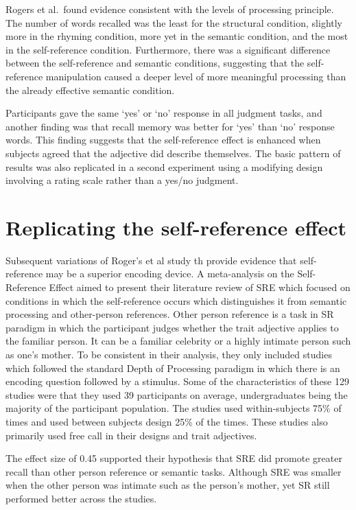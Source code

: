 \documentclass[
  man,floatsintext]{apa6}
\begin{document}
Rogers et al.~found evidence consistent with the levels of processing principle. The number of words recalled was the least for the structural condition, slightly more in the rhyming condition, more yet in the semantic condition, and the most in the self-reference condition. Furthermore, there was a significant difference between the self-reference and semantic conditions, suggesting that the self-reference manipulation caused a deeper level of more meaningful processing than the already effective semantic condition.

Participants gave the same `yes' or `no' response in all judgment tasks, and another finding was that recall memory was better for `yes' than `no' response words. This finding suggests that the self-reference effect is enhanced when subjects agreed that the adjective did describe themselves. The basic pattern of results was also replicated in a second experiment using a modifying design involving a rating scale rather than a yes/no judgment.

\hypertarget{replicating-the-self-reference-effect}{%
\section{Replicating the self-reference effect}\label{replicating-the-self-reference-effect}}

Subsequent variations of Roger's et al study th provide evidence that self-reference may be a superior encoding device. A meta-analysis on the Self-Reference Effect aimed to present their literature review of SRE which focused on conditions in which the self-reference occurs which distinguishes it from semantic processing and other-person references. Other person reference is a task in SR paradigm in which the participant judges whether the trait adjective applies to the familiar person. It can be a familiar celebrity or a highly intimate person such as one's mother. To be consistent in their analysis, they only included studies which followed the standard Depth of Processing paradigm in which there is an encoding question followed by a stimulus. Some of the characteristics of these 129 studies were that they used 39 participants on average, undergraduates being the majority of the participant population. The studies used within-subjects 75\% of times and used between subjects design 25\% of the times. These studies also primarily used free call in their designs and trait adjectives.

The effect size of 0.45 supported their hypothesis that SRE did promote greater recall than other person reference or semantic tasks. Although SRE was smaller when the other person was intimate such as the person's mother, yet SR still performed better across the studies.
\end{document}
